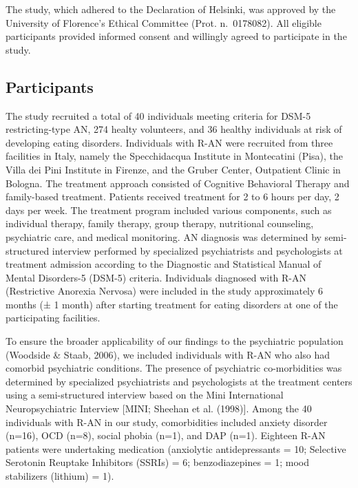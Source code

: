 \documentclass[
  man,floatsintext]{apa6}
\begin{document}
The study, which adhered to the Declaration of Helsinki, was approved by the University of Florence's Ethical Committee (Prot. n.~0178082). All eligible participants provided informed consent and willingly agreed to participate in the study.

\hypertarget{participants}{%
\subsection{Participants}\label{participants}}

The study recruited a total of 40 individuals meeting criteria for DSM-5 restricting-type AN, 274 healty volunteers, and 36 healthy individuals at risk of developing eating disorders. Individuals with R-AN were recruited from three facilities in Italy, namely the Specchidacqua Institute in Montecatini (Pisa), the Villa dei Pini Institute in Firenze, and the Gruber Center, Outpatient Clinic in Bologna. The treatment approach consisted of Cognitive Behavioral Therapy and family-based treatment. Patients received treatment for 2 to 6 hours per day, 2 days per week. The treatment program included various components, such as individual therapy, family therapy, group therapy, nutritional counseling, psychiatric care, and medical monitoring. AN diagnosis was determined by semi-structured interview performed by specialized psychiatrists and psychologists at treatment admission according to the Diagnostic and Statistical Manual of Mental Disorders-5 (DSM-5) criteria. Individuals diagnosed with R-AN (Restrictive Anorexia Nervosa) were included in the study approximately 6 months (± 1 month) after starting treatment for eating disorders at one of the participating facilities.

To ensure the broader applicability of our findings to the psychiatric population (Woodside \& Staab, 2006), we included individuals with R-AN who also had comorbid psychiatric conditions. The presence of psychiatric co-morbidities was determined by specialized psychiatrists and psychologists at the treatment centers using a semi-structured interview based on the Mini International Neuropsychiatric Interview {[}MINI; Sheehan et al. (1998){]}. Among the 40 individuals with R-AN in our study, comorbidities included anxiety disorder (n=16), OCD (n=8), social phobia (n=1), and DAP (n=1). Eighteen R-AN patients were undertaking medication (anxiolytic antidepressants = 10; Selective Serotonin Reuptake Inhibitors (SSRIs) = 6; benzodiazepines = 1; mood stabilizers (lithium) = 1).
\end{document}
